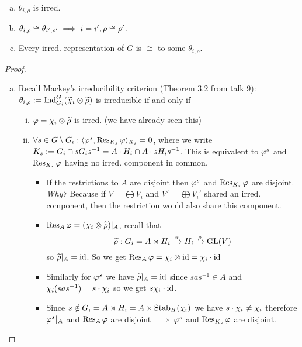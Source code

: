 \documentclass[a4paper]{article}
\begin{document}
\begin{prop} [Proposition 25]\item
\begin{enumerate}[(a)]
  \item $\theta_{i, \rho}$ is irred.
  \item $\theta_{i,\rho} \cong \theta_{i',\rho'} \implies i = i', \rho \cong \rho'$.
  \item Every irred. representation of $G$ is $\cong $ to some $\theta_{i,\rho}$.
\end{enumerate}
\begin{proof}
\begin{enumerate}[(a)]
  \item Recall Mackey's irreducibility criterion (Theorem 3.2 from talk 9): $\theta_{i, \rho}:= \operatorname{Ind}_{G_{i}}^{G}(\widetilde \chi_{i} \otimes \widetilde \rho)$ is irreducible if and only if
        \begin{enumerate}[(i)]
          \item $\varphi = \chi_{i} \otimes \widetilde \rho$ is irred. (we have already seen this)
          \item $\forall s \in G \setminus G_{i}: \langle\varphi^{s}, \operatorname{Res}_{K_{s}}\varphi\rangle_{K_{s}} = 0$, where we write $K_{s} := G_{i} \cap sG_{i}s^{-1} = A\cdot H_{i} \cap A\cdot sH_{i}s^{-1}$. This is equivalent to $\varphi^{s}$ and $\operatorname{Res}_{K_{s}} \varphi$ having no irred. component in common.
                \begin{itemize}
                  \item If the restrictions to $A$ are disjoint then $\varphi^{s}$ and $\operatorname{Res}_{K_{s}} \varphi$ are disjoint. \emph{Why?} Because if $V = \bigoplus V_{i}$ and $V' = \bigoplus V_{i}'$ shared an irred. component, then the restriction would also share this component.
                  \item $\operatorname{Res}_{A}\varphi = (\chi_{i} \otimes \widetilde \rho)|_{A}$, recall that
                        \[\widetilde \rho: G_{i} = A \rtimes H_{i} \xrightarrow \pi H_{i} \xrightarrow \rho \operatorname{GL}(V)\]
                        so $\widetilde \rho|_{A} = \operatorname{id}$. So we get $\operatorname{Res}_{A} \varphi = \chi_{i} \otimes \operatorname{id}  = \chi_{i}\cdot\operatorname{id}$
                  \item Similarly for $\varphi^{s}$ we have $\widetilde \rho|_{A} = \operatorname{id}$ since $sas^{-1} \in A$ and $\chi_{i}(sas^{-1}) = s \cdot \chi_{i}$ so we get $s  \chi_{i} \cdot \operatorname{id}$.
                        \item Since $s \notin G_{i} = A \rtimes H_{i} = A \rtimes \operatorname{Stab}_{H}(\chi_{i})$ we have $s \cdot \chi_{i} \ne \chi_{i}$ therefore $\varphi^{s}|_{A}$ and $\operatorname{Res}_{A} \varphi$ are disjoint $\implies \varphi^{s}$ and $\operatorname{Res}_{K_{s}} \varphi$ are disjoint.

\end{itemize}
\end{enumerate}
\end{enumerate}
\end{proof}
\end{prop}
\end{document}
